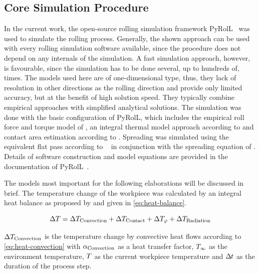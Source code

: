 \subsection{Core Simulation Procedure}\label{subsec:simulation-procedure}

In the current work, the open-source rolling simulation framework PyRolL~\cite{pyroll_jors, pyroll2.1} was used to simulate the rolling process.
Generally, the shown approach can be used with every rolling simulation software available, since the procedure does not depend on any internals of the simulation.
A fast simulation approach, however, is favourable, since the simulation has to be done several, up to hundreds of, times.
The models used here are of one-dimensional type, thus, they lack of resolution in other directions as the rolling direction and provide only limited accuracy, but at the benefit of high solution speed.
They typically combine empirical approaches with simplified analytical solutions.
The simulation was done with the basic configuration of PyRolL, which includes the empirical roll force and torque model of \textcite{Hensel1978}, an integral thermal model approach according to \textcite{Hensel1990} and contact area estimation according to \textcite{Zouhar1960}.
Spreading was simulated using the equivalent flat pass according to \citeauthor*{Lendl1948}~\cite{Lendl1948, Lendl1948a, Lendl1949} in conjunction with the spreading equation of \textcite{Wusatowski1969}.
Details of software construction and model equations are provided in the documentation of PyRolL~\cite{pyroll}.

The models most important for the following elaborations will be discussed in brief.
The temperature change of the workpiece was calculated by an integral heat balance as proposed by \textcite{Hensel1990} and given in \autoref{eq:heat-balance}.

\begin{equation}
    \Delta{T} = {\Delta{T}_\mathrm{Convection}} + {\Delta{T}_\mathrm{Contact}} + \Delta{T}_{{\varphi}} + {\Delta{T}_\mathrm{Radiation}}
    \label{eq:heat-balance}
\end{equation}

\noindent${\Delta{T}_\mathrm{Convection}}$ is the temperature change by convective heat flows according to \autoref{eq:heat-convection} with ${{\alpha}_\mathrm{Convection}}$ as a heat transfer factor, ${{T}_\infty}$ as the environment temperature, ${T}$ as the current workpiece temperature and ${\Delta\mspace{-1mu}t}$ as the duration of the process step.

